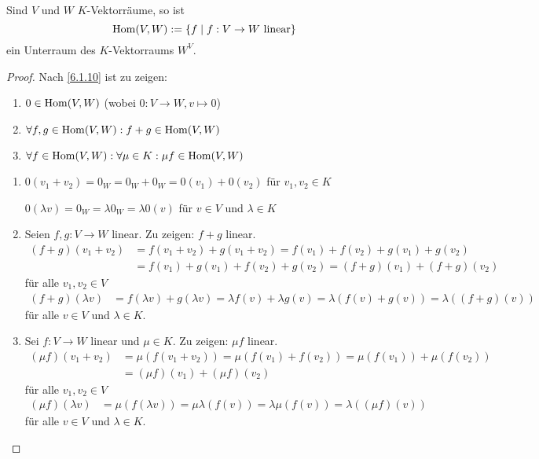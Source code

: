 \documentclass[../../main.tex]{subfiles}
\begin{document}
\begin{notpro}\label{7.1.6}
Sind $V$ und $W$ $K$-Vektorräume, so ist
$$\Hom(V,W) := \left\{f\mid f:V\to W \text{ linear}\right\}\index{Vektorraum@{\bf Vektorraum}!Homomorphismus/ lineare Abbildung!Hom@$\Hom(V,W)$}$$
ein Unterraum des $K$-Vektorraums $W^V$.
\end{notpro}
\begin{proof}
Nach \ref{6.1.10} ist zu zeigen:
\begin{enumerate}[\normalfont(a)]
\item $0\in \operatorname{Hom}(V,W)$ (wobei $0:V\to W, v\mapsto 0$)
\item $\forall f,g\in \operatorname{Hom}(V,W): f+g \in \operatorname{Hom}(V,W)$
\item $\forall f\in \operatorname{Hom}(V,W):\forall \mu\in K: \mu f\in \operatorname{Hom}(V,W)$
\end{enumerate}
\begin{enumerate}[Zu (a).]
\item $0 (v_1 +v_2) = 0_W = 0_W + 0_W = 0(v_1) + 0(v_2)$ für $v_1,v_2\in K$

$0(\lambda v) = 0_W = \lambda0_W = \lambda 0(v)$ für $v\in V$ und $\lambda\in K$
\item Seien $f,g:V\to W$ linear. Zu zeigen: $f+g$ linear.
\begin{align*}
(f+g)(v_1+v_2) & = f(v_1+v_2) + g(v_1+v_2) = f(v_1) + f(v_2) + g(v_1) + g(v_2)\\
& = f(v_1) + g(v_1) + f(v_2) + g(v_2) = (f+g)(v_1) + (f+g)(v_2)
\end{align*}
für alle $v_1,v_2\in V$
\begin{align*}
(f+g)(\lambda v) & = f(\lambda v) + g(\lambda v) = \lambda f(v) +\lambda g(v) = \lambda(f(v)+g(v)) = \lambda ((f+g)(v))
\end{align*}
für alle $v\in V$ und $\lambda\in K$.
\item Sei $f:V\to W$ linear und $\mu\in K$. Zu zeigen: $\mu f$ linear.
\begin{align*}
(\mu f)(v_1+v_2) & = \mu(f(v_1+v_2)) = \mu(f(v_1)+f(v_2)) = \mu(f(v_1)) + \mu(f(v_2))\\
& = (\mu f)(v_1) + (\mu f)(v_2)
\end{align*}
für alle $v_1,v_2\in V$
\begin{align*}
(\mu f)(\lambda v) & = \mu (f(\lambda v)) = \mu\lambda(f(v)) = \lambda \mu(f(v)) = \lambda ((\mu f)(v))
\end{align*}
für alle $v\in V$ und $\lambda\in K$.
\end{enumerate}
\end{proof}
\end{document}

